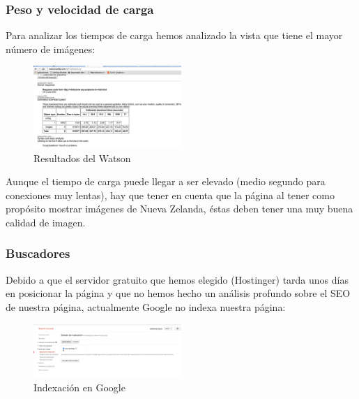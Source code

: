 \subsubsection{Peso y velocidad de carga}
Para analizar los tiempos de carga hemos analizado la vista que tiene el mayor número de imágenes:
\begin{figure}[h]
	\centering
	\includegraphics[width=0.50\textwidth]{./Fotos/watson.png}
	\caption{Resultados del Watson}
	\label{fig: Resultados del Watson}
\end{figure}
Aunque el tiempo de carga puede llegar a ser elevado (medio segundo para conexiones muy lentas), hay que tener en cuenta que la página al tener como propósito mostrar imágenes de Nueva Zelanda, éstas deben tener una muy buena calidad de imagen.

\subsubsection{Buscadores}
Debido a que el servidor gratuito que hemos elegido (Hostinger) tarda unos días en posicionar la página y que no hemos hecho un análisis profundo sobre el SEO de nuestra página, actualmente Google no indexa nuestra página:

\begin{figure}[h]
	\centering
	\includegraphics[width=0.50\textwidth]{./Fotos/indexacion.png}
	\caption{Indexación en Google}
	\label{fig: Indexación en Google}
\end{figure}


\clearpage


